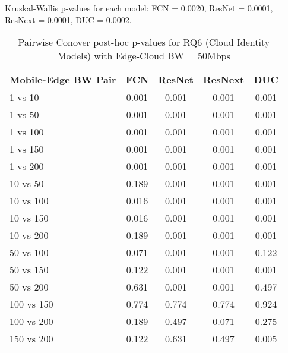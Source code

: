 \begin{table}[h]
\centering
\caption{Pairwise Conover post-hoc p-values for RQ6 (Cloud Identity Models) with Edge-Cloud BW = 50Mbps}
\label{tab:conover_cloud_identity_ec50}
\smallskip
Kruskal-Wallis p-values for each model: FCN = 0.0020, ResNet = 0.0001, ResNext = 0.0001, DUC = 0.0002.

\begin{tabular}{lcccc}
\toprule
Mobile-Edge BW Pair & FCN & ResNet & ResNext & DUC \\
\midrule
1 vs 10 & 0.001 & 0.001 & 0.001 & 0.001 \\
1 vs 50 & 0.001 & 0.001 & 0.001 & 0.001 \\
1 vs 100 & 0.001 & 0.001 & 0.001 & 0.001 \\
1 vs 150 & 0.001 & 0.001 & 0.001 & 0.001 \\
1 vs 200 & 0.001 & 0.001 & 0.001 & 0.001 \\
10 vs 50 & 0.189 & 0.001 & 0.001 & 0.001 \\
10 vs 100 & 0.016 & 0.001 & 0.001 & 0.001 \\
10 vs 150 & 0.016 & 0.001 & 0.001 & 0.001 \\
10 vs 200 & 0.189 & 0.001 & 0.001 & 0.001 \\
50 vs 100 & 0.071 & 0.001 & 0.001 & 0.122 \\
50 vs 150 & 0.122 & 0.001 & 0.001 & 0.001 \\
50 vs 200 & 0.631 & 0.001 & 0.001 & 0.497 \\
100 vs 150 & 0.774 & 0.774 & 0.774 & 0.924 \\
100 vs 200 & 0.189 & 0.497 & 0.071 & 0.275 \\
150 vs 200 & 0.122 & 0.631 & 0.497 & 0.005 \\
\bottomrule
\end{tabular}
\end{table}

